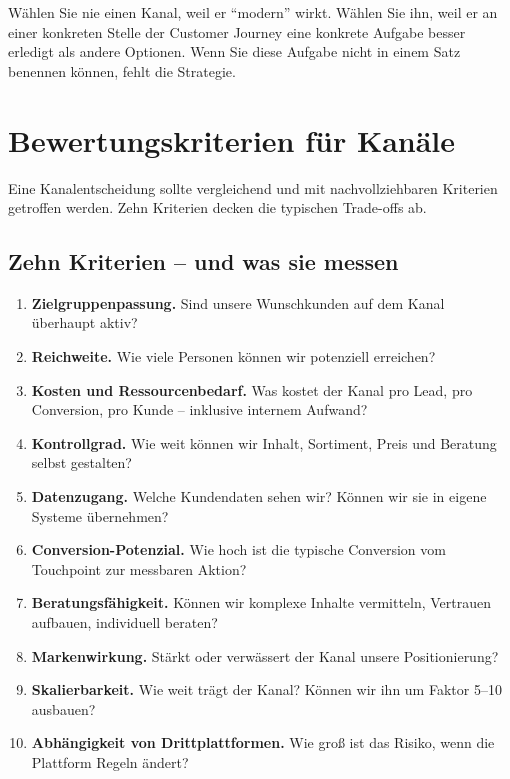 \documentclass[11pt,a4paper,oneside]{article}
\newcommand{\fachbegriff}[1]{\textbf{#1}}
\begin{document}
\begin{merkbox}
Wählen Sie nie einen Kanal, weil er ``modern'' wirkt. Wählen Sie ihn, weil er an einer konkreten Stelle der Customer Journey eine konkrete Aufgabe besser erledigt als andere Optionen. Wenn Sie diese Aufgabe nicht in einem Satz benennen können, fehlt die Strategie.
\end{merkbox}

\section{Bewertungskriterien für Kanäle}

Eine Kanalentscheidung sollte vergleichend und mit nachvollziehbaren Kriterien getroffen werden. Zehn Kriterien decken die typischen Trade-offs ab.

\subsection{Zehn Kriterien -- und was sie messen}

\begin{enumerate}
  \item \fachbegriff{Zielgruppenpassung.} Sind unsere Wunschkunden auf dem Kanal überhaupt aktiv?
  \item \fachbegriff{Reichweite.} Wie viele Personen können wir potenziell erreichen?
  \item \fachbegriff{Kosten und Ressourcenbedarf.} Was kostet der Kanal pro Lead, pro Conversion, pro Kunde -- inklusive internem Aufwand?
  \item \fachbegriff{Kontrollgrad.} Wie weit können wir Inhalt, Sortiment, Preis und Beratung selbst gestalten?
  \item \fachbegriff{Datenzugang.} Welche Kundendaten sehen wir? Können wir sie in eigene Systeme übernehmen?
  \item \fachbegriff{Conversion-Potenzial.} Wie hoch ist die typische Conversion vom Touchpoint zur messbaren Aktion?
  \item \fachbegriff{Beratungsfähigkeit.} Können wir komplexe Inhalte vermitteln, Vertrauen aufbauen, individuell beraten?
  \item \fachbegriff{Markenwirkung.} Stärkt oder verwässert der Kanal unsere Positionierung?
  \item \fachbegriff{Skalierbarkeit.} Wie weit trägt der Kanal? Können wir ihn um Faktor 5--10 ausbauen?
  \item \fachbegriff{Abhängigkeit von Drittplattformen.} Wie groß ist das Risiko, wenn die Plattform Regeln ändert?
\end{enumerate}
\end{document}
